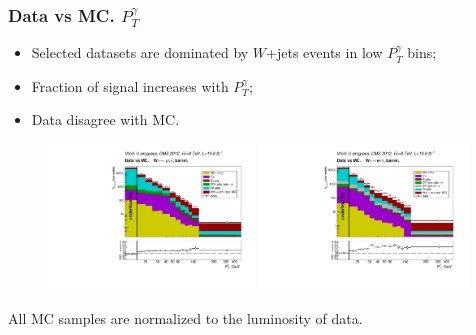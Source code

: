 \begin{frame}\frametitle{Data vs MC. $P_T^{\gamma}$}
\scriptsize
\begin{itemize}
   \item Selected datasets are dominated by $W$+jets events in low $P_T^{\gamma}$ bins;
   \item Fraction of signal increases with $P_T^{\gamma}$;
   \item Data disagree with MC.
\end{itemize}
  \begin{figure}[htb]
    \begin{center}
       \includegraphics[width=0.49\textwidth]{../figs/figs_v11/MUON_WGamma/PrepareYields/c_TotalDATAvsMC_Barrel__phoEt.pdf} \includegraphics[width=0.49\textwidth]{../figs/figs_v11/ELECTRON_WGamma/PrepareYields/c_TotalDATAvsMC_Barrel__phoEt.pdf} 
    \end{center}
  \end{figure}
\tiny
All MC samples are normalized to the luminosity of data.
\end{frame}


